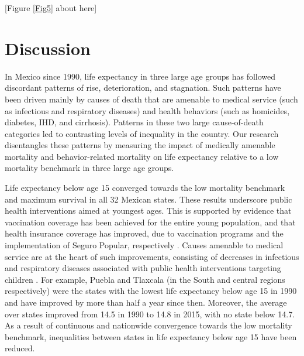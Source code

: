 \documentclass{bmcart}
\begin{document}
\begin{center}
[Figure \ref{Fig5} about here]
\end{center}



\section*{Discussion}

In Mexico since 1990, life expectancy in three large age groups has followed discordant patterns of rise, deterioration, and stagnation. Such patterns have been driven mainly by causes of death that are amenable to medical service (such as infectious and respiratory diseases) and health behaviors (such as homicides, diabetes, IHD, and cirrhosis). Patterns in these two large cause-of-death categories led to contrasting levels of inequality in the country. Our research disentangles these patterns by measuring the impact of medically amenable mortality and behavior-related mortality on life expectancy relative to a low mortality benchmark in three large age groups.

Life expectancy below age 15 converged towards the low mortality benchmark and maximum survival in all 32 Mexican states. These results underscore public health interventions aimed at youngest ages. This is supported by evidence that vaccination coverage has been achieved for the entire young population, and that health insurance coverage has improved, due to vaccination programs and the implementation of Seguro Popular, respectively \cite{urquieta2015evolution}. Causes amenable to medical service are at the heart of such improvements, consisting of decreases in infectious and respiratory diseases associated with public health interventions targeting children \cite{sepulveda2006}. For example, Puebla and Tlaxcala (in the South and central regions respectively) were the states with the lowest life expectancy below age 15 in 1990 and have improved by more than half a year since then. Moreover, the average over states improved from 14.5 in 1990 to 14.8 in 2015, with no state below 14.7. As a result of continuous and nationwide convergence towards the low mortality benchmark, inequalities between states in life expectancy below age 15 have been reduced. 
\end{document}

